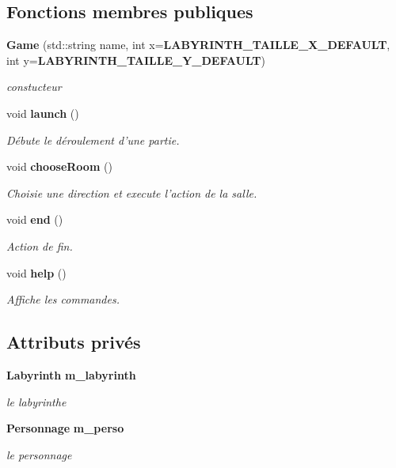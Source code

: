 \subsection*{Fonctions membres publiques}
\begin{DoxyCompactItemize}
\item 
{\bf Game} (std\-::string name, int x={\bf L\-A\-B\-Y\-R\-I\-N\-T\-H\-\_\-\-T\-A\-I\-L\-L\-E\-\_\-\-X\-\_\-\-D\-E\-F\-A\-U\-L\-T}, int y={\bf L\-A\-B\-Y\-R\-I\-N\-T\-H\-\_\-\-T\-A\-I\-L\-L\-E\-\_\-\-Y\-\_\-\-D\-E\-F\-A\-U\-L\-T})
\begin{DoxyCompactList}\small\item\em constucteur \end{DoxyCompactList}\item 
void {\bf launch} ()
\begin{DoxyCompactList}\small\item\em Débute le déroulement d'une partie. \end{DoxyCompactList}\item 
void {\bf choose\-Room} ()
\begin{DoxyCompactList}\small\item\em Choisie une direction et execute l'action de la salle. \end{DoxyCompactList}\item 
void {\bf end} ()
\begin{DoxyCompactList}\small\item\em Action de fin. \end{DoxyCompactList}\item 
void {\bf help} ()
\begin{DoxyCompactList}\small\item\em Affiche les commandes. \end{DoxyCompactList}\end{DoxyCompactItemize}
\subsection*{Attributs privés}
\begin{DoxyCompactItemize}
\item 
{\bf Labyrinth} {\bf m\-\_\-labyrinth}
\begin{DoxyCompactList}\small\item\em le labyrinthe \end{DoxyCompactList}\item 
{\bf Personnage} {\bf m\-\_\-perso}
\begin{DoxyCompactList}\small\item\em le personnage \end{DoxyCompactList}\end{DoxyCompactItemize}


